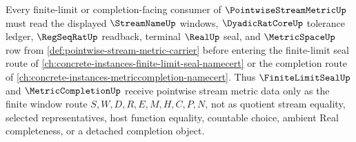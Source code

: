 Every finite-limit or completion-facing consumer of $\PointwiseStreamMetricUp$ must read the displayed $\StreamNameUp$ windows, $\DyadicRatCoreUp$ tolerance ledger, $\RegSeqRatUp$ readback, terminal $\RealUp$ seal, and $\MetricSpaceUp$ row from \autoref{def:pointwise-stream-metric-carrier} before entering the finite-limit seal route of \autoref{ch:concrete-instances-finite-limit-seal-namecert} or the completion route of \autoref{ch:concrete-instances-metriccompletion-namecert}. Thus $\FiniteLimitSealUp$ and $\MetricCompletionUp$ receive pointwise stream metric data only as the finite window route $S,W,D,R,E,M,H,C,P,N$, not as quotient stream equality, selected representatives, host function equality, countable choice, ambient Real completeness, or a detached completion object.
